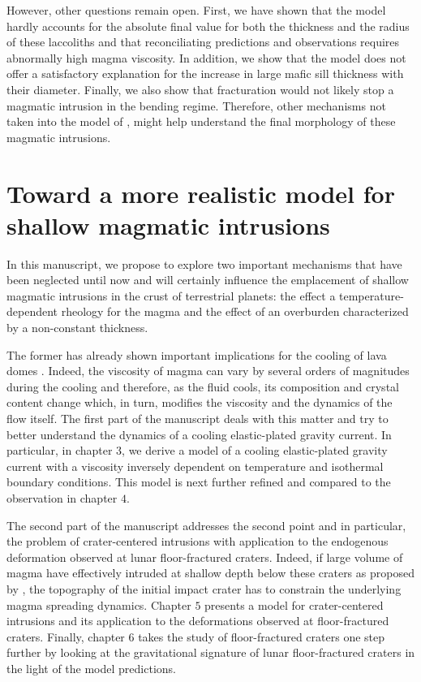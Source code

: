 However, other questions  remain open.  First, we have  shown that the
model  hardly accounts  for  the  absolute final  value  for both  the
thickness and the  radius of these laccoliths  and that reconciliating
predictions and observations requires abnormally high magma viscosity.
In addition,  we show  that the  model does  not offer  a satisfactory
explanation for the increase in  large mafic sill thickness with their
diameter. Finally,  we also  show that  fracturation would  not likely
stop  a magmatic  intrusion in  the bending  regime. Therefore,  other
mechanisms not  taken into the model  of \citet{Michaut:2011kg}, might
help understand the final morphology of these magmatic intrusions.

\section{Toward   a  more   realistic  model   for  shallow   magmatic
  intrusions}
\label{C2-sec:discussion}

In this  manuscript, we  propose to  explore two  important mechanisms
that have  been neglected until  now and will certainly  influence the
emplacement of shallow magmatic intrusions in the crust of terrestrial
planets: the effect a temperature-dependent rheology for the magma and
the effect of an overburden characterized by a non-constant thickness.

The former has already shown important implications for the cooling of
lava                                                             domes
\citep{Bercovici:2007vc,Bercovici:1996uu,BALMFORTH:1999ey,Garel:2014era}. Indeed,
the viscosity of magma can vary by several orders of magnitudes during
the  cooling \citep{Anonymous:CZVBrBvv,Lejeune:1995fc}  and therefore,
as the fluid cools, its  composition and crystal content change which,
in  turn,  modifies  the  viscosity  and  the  dynamics  of  the  flow
itself. The  first part of the  manuscript deals with this  matter and
try  to better  understand the  dynamics of  a cooling  elastic-plated
gravity current.  In particular, in chapter  $3$, we derive a model of
a cooling  elastic-plated gravity  current with a  viscosity inversely
dependent  on temperature  and isothermal  boundary conditions.   This
model  is next  further refined  and  compared to  the observation  in
chapter $4$.

The second  part of the manuscript  addresses the second point  and in
particular, the problem of crater-centered intrusions with application
to  the  endogenous  deformation  observed  at  lunar  floor-fractured
craters.  Indeed, if  large volume of magma  have effectively intruded
at   shallow    depth   below    these   craters   as    proposed   by
\citet{Schultz:1976kt}, the  topography of  the initial  impact crater
has to constrain the underlying  magma spreading dynamics. Chapter $5$
presents a model for crater-centered intrusions and its application to
the  deformations  observed   at  floor-fractured  craters.   Finally,
chapter  $6$  takes the  study  of  floor-fractured craters  one  step
further   by  looking   at  the   gravitational  signature   of  lunar
floor-fractured craters in the light of the model predictions.

